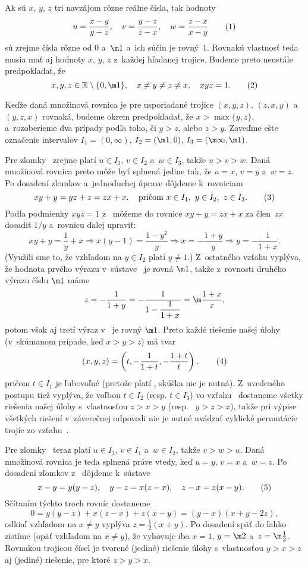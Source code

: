 {%
Ak sú $x$, $y$, $z$ tri navzájom rôzne reálne čísla, tak hodnoty
$$
u=\frac{x-y}{y-z},\quad v=\frac{y-z}{z-x},\quad
w=\frac{z-x}{x-y}
\tag1
$$
sú zrejme čísla rôzne od $0$ a~$\m1$ a~ich súčin je rovný~$1$.
Rovnakú vlastnosť teda musia mať aj hodnoty $x$, $y$, $z$ 
z~každej hľadanej trojice. Budeme preto neustále predpokladať, že
$$
x,y,z\in\Bbb R\setminus\{0,\m1\},\quad
x\ne y\ne z\ne x,\quad xyz=1.          \tag2
$$

Keďže daná množinová rovnica je pre usporiadané trojice
$(x,y,z)$, $(z,x,y)$ a~$(y,z,x)$ rovnaká, budeme okrem 
predpokladať, že $x>\max\{y,z\}$, a~rozoberieme dva prípady
podľa toho, či $y>z$, alebo $z>y$. Zaveďme ešte označenie
intervalov $I_1=(0,\infty)$, $I_2=(\m1,0)$,
$I_3=(\m\infty,\m1)$.

Pre zlomky~ zrejme platí $u\in I_1$,
$v\in I_2$ a~$w\in I_3$, takže $u>v>w$. Daná množinová rovnica
preto môže byť splnená jedine tak, že $u=x$, $v=y$ a~$w=z$.
Po dosadení zlomkov  a~jednoduchej úprave dôjdeme k~rovniciam
$$
xy+y=yz+z=zx+x,\quad\text{pričom}\ x\in I_1,\ y\in I_2,\ z\in I_3.
\tag3
$$
Podľa podmienky $xyz=1$ z~ môžeme do rovnice $xy+y=zx+x$
za člen~$zx$ dosadiť $1/y$ a~rovnicu ďalej
upraviť:
$$
xy+y=\frac{1}{y}+x\Rightarrow
x(y-1)=\frac{1-y^2}{y}\Rightarrow
x=-\frac{1+y}{y}\Rightarrow
y=-\frac{1}{1+x}.
$$
(Využili sme to, že vzhľadom na $y\in I_2$ platí $y\ne1$.)
Z~ostatného vzťahu vyplýva, že hodnota prvého
výrazu v~sústave~ je rovná $\m1$, takže z~rovnosti druhého
výrazu číslu $\m1$ máme
$$
z=-\frac{1}{1+y}=-\frac{1}{1-\dfrac{1}{1+x}}=\m\frac{1+x}{x},
$$
potom však aj tretí výraz v~ je rovný $\m1$.
Preto každé riešenie našej úlohy
(v~skúmanom prípade, keď $x>y>z$) má tvar
$$
(x,y,z)=\left(t,-\frac{1}{1+t},-\frac{1+t}{t}\right), \tag4
$$
pričom $t\in I_1$ je ľubovoľné (pretože platí , skúška nie je
nutná). Z~uvedeného postupu tiež vyplýva, že
voľbou $t\in I_2$ (resp. $t\in I_3$) vo vzťahu~
dostaneme všetky riešenia našej úlohy s~vlastnosťou $z>x>y$ (resp.~
$y>z>x$), takže pri výpise všetkých riešení v~záverečnej odpovedi nie je
nutné uvádzať cyklické permutácie trojíc zo vzťahu~.

Pre zlomky~ teraz platí $u\in I_3$,
$v\in I_1$ a~$w\in I_2$, takže $v>w>u$. Daná množinová rovnica
je teda splnená práve vtedy, keď $u=y$, $v=x$ a~$w=z$. Po dosadení
zlomkov z~ dôjdeme k~sústave
$$
x-y=y(y-z),\quad y-z=x(z-x),\quad z-x=z(x-y). \tag5
$$
Sčítaním týchto troch rovníc dostaneme
$$
0=y(y-z)+x(z-x)+z(x-y)=(y-x)(x+y-2z),
$$
odkiaľ vzhľadom na $x\ne y$ vyplýva $z=\frac12(x+y)$. Po dosadení
späť do ľahko zistíme (opäť vzhľadom na $x\ne y$), že
vyhovuje iba $x=1$, $y=\m2$ a~$z=\m\frac12$.
Rovnakou trojicou čísel je tvorené (jediné) riešenie úlohy
s~vlastnosťou $y>x>z$ aj (jediné) riešenie, pre ktoré $z>y>x$.

}
